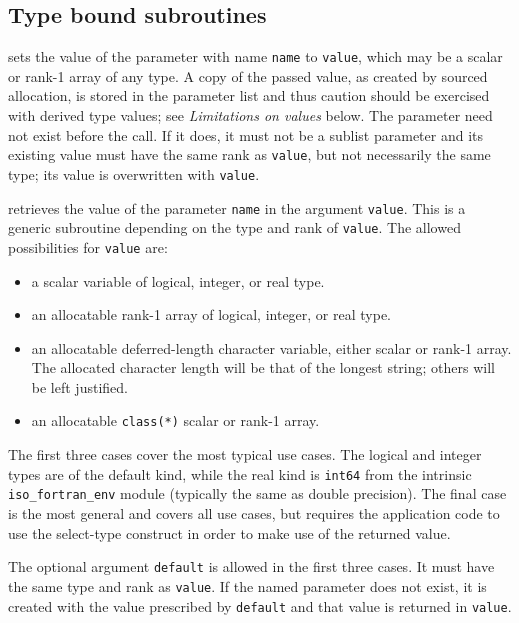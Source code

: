 \documentclass[11pt]{article}
\begin{document}
\subsection{Type bound subroutines}
\begin{description}[style=nextline]\setlength{\itemsep}{0pt}
\item[\texttt{set(name, value \Lbr,stat \Lbr,errmsg\Rbr\Rbr)}]
  sets the value of the parameter with name \texttt{name} to \texttt{value},
  which may be a scalar or rank-1 array of any type.  A copy of the passed
  value, as created by sourced allocation, is stored in the parameter list
  and thus caution should be exercised with derived type values; see
  \emph{Limitations on values} below.  The parameter need not exist before
  the call.  If it does, it must not be a sublist parameter and its existing
  value must have the same rank as \texttt{value}, but not necessarily the
  same type; its value is overwritten with \texttt{value}.
\item[\texttt{get(name, value \Lbr,default\Rbr\ \Lbr,stat \Lbr,errmsg\Rbr\Rbr)}]
  retrieves the value of the parameter \texttt{name} in the argument
  \texttt{value}.  This is a generic subroutine depending on the type and rank
  of \texttt{value}.  The allowed possibilities for \texttt{value} are:
  \begin{itemize}\setlength{\itemsep}{0pt}
  \item a scalar variable of logical, integer, or real type.
  \item an allocatable rank-1 array of logical, integer, or real type.
  \item an allocatable deferred-length character variable, either scalar
    or rank-1 array.  The allocated character length will be that of the
    longest string; others will be left justified.
  \item an allocatable \texttt{class(*)} scalar or rank-1 array.
  \end{itemize}
  The first three cases cover the most typical use cases.  The logical and
  integer types are of the default kind, while the real kind is \texttt{int64}
  from the intrinsic \texttt{iso_fortran_env} module (typically the same as
  double precision).  The final case is the most general and covers all use
  cases, but requires the application code to use the select-type construct
  in order to make use of the returned value.
  
  The optional argument \texttt{default} is allowed in the first three cases.
  It must have the same type and rank as \texttt{value}. If the named parameter
  does not exist, it is created with the value prescribed by \texttt{default}
  and that value is returned in \texttt{value}.


\end{description}
\end{document}
